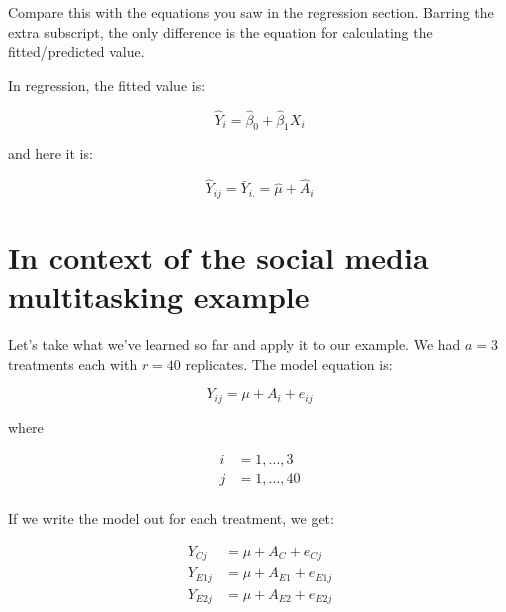 \documentclass[
  letterpaper,
]{book}
\begin{document}
\begin{tcolorbox}[enhanced jigsaw, title={Compare this with regression}, opacityback=0, arc=.35mm, coltitle=black, leftrule=.75mm, left=2mm, titlerule=0mm, breakable, colback=white, opacitybacktitle=0.6, colframe=quarto-callout-caution-color-frame, bottomrule=.15mm, colbacktitle=quarto-callout-caution-color!10!white, bottomtitle=1mm, toptitle=1mm, rightrule=.15mm, toprule=.15mm]

Compare this with the equations you saw in the regression section.
Barring the extra subscript, the only difference is the equation for
calculating the fitted/predicted value.

In regression, the fitted value is:

\[ \hat{Y}_i = \hat{\beta}_0 + \hat{\beta}_1X_i \]

and here it is:

\[ \hat{Y}_{ij} = \bar{Y}_{i.} = \hat{\mu} + \hat{A}_i \]

\end{tcolorbox}

\section{In context of the social media multitasking
example}\label{in-context-of-the-social-media-multitasking-example}

Let's take what we've learned so far and apply it to our example. We had
\(a = 3\) treatments each with \(r=40\) replicates. The model equation
is:

\[ Y_{ij} = \mu + A_{i} + e_{ij}  \]

where

\begin{equation}
\begin{aligned}
i & = 1, \dots, 3  \\
j & = 1, \dots, 40 \\
\end{aligned}
\end{equation}

If we write the model out for each treatment, we get:

\begin{equation}
\begin{aligned}
Y_{Cj} &= \mu + A_C + e_{Cj} \\ 
Y_{E1j} &= \mu + A_{E1} + e_{E1j} \\ 
Y_{E2j} &= \mu + A_{E2} + e_{E2j} \\
\end{aligned}
\end{equation}
\end{document}
